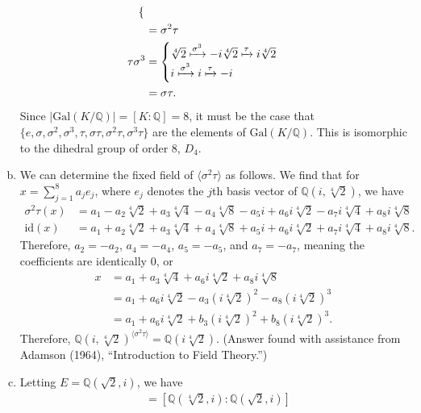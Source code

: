\documentclass[10pt]{extarticle}
\newcommand{\Q}{\mathbb{Q}}
\begin{document}
\begin{enumerate}[(a)]
\begin{align*}
\begin{cases}
              \end{cases}\\
                           &= \sigma^2\tau\\
                \tau\sigma^3 &= \begin{cases}
                  \sqrt[4]{2} \xmapsto{\sigma^3}-i\sqrt[4]{2}\xmapsto{\tau}i\sqrt[4]{2}\\
                  i \xmapsto{\sigma^3}i\xmapsto{\tau}-i
                \end{cases}\\
                             &= \sigma\tau.
      \end{align*}
      Since $|\text{Gal}(K/\Q)| = [K:\Q] = 8$, it must be the case that $\{e,\sigma,\sigma^2,\sigma^3,\tau,\sigma\tau,\sigma^2\tau,\sigma^3\tau\}$ are the elements of $\text{Gal}(K/\Q)$. This is isomorphic to the dihedral group of order 8, $D_4$.
    \item We can determine the fixed field of $\langle \sigma^2\tau\rangle$ as follows. We find that for $x = \sum_{j=1}^{8}a_je_j$, where $e_j$ denotes the $j$th basis vector of $\Q(i,\sqrt[4]{2})$, we have
      \begin{align*}
        \sigma^2\tau(x) &= a_1 - a_2\sqrt[4]{2} + a_3\sqrt[4]{4} - a_4\sqrt[4]{8} - a_5i + a_6i\sqrt[4]{2} - a_7i\sqrt[4]{4} + a_8i\sqrt[4]{8}\\
        \text{id}(x) &= a_1 + a_2\sqrt[4]{2} + a_3\sqrt[4]{4} + a_4\sqrt[4]{8} + a_5i + a_6i\sqrt[4]{2} + a_7i\sqrt[4]{4} + a_8i\sqrt[4]{8}.
      \end{align*}
      Therefore, $a_2 = -a_2$, $a_4 = -a_4$, $a_5 = -a_5$, and $a_7 = -a_7$, meaning the coefficients are identically $0$, or
      \begin{align*}
        x &= a_1 + a_3\sqrt[4]{4} + a_6i\sqrt[4]{2} + a_8i\sqrt[4]{8}\\
          &= a_1 + a_6i\sqrt[4]{2} - a_3\left(i\sqrt[4]{2}\right)^2 - a_8\left(i\sqrt[4]{2}\right)^3\\
          &= a_1 + a_6i\sqrt[4]{2} + b_3\left(i\sqrt[4]{2}\right)^2 + b_8\left(i\sqrt[4]{2}\right)^3.
      \end{align*}
      Therefore, $\Q\left(i,\sqrt[4]{2}\right)^{\langle \sigma^2\tau \rangle} = \Q(i\sqrt[4]{2})$. (Answer found with assistance from Adamson (1964), ``Introduction to Field Theory.'')
    \item Letting $E = \Q(\sqrt{2},i)$, we have
      \begin{align*}
        [K:E] &= [\Q(\sqrt[4]{2},i):\Q(\sqrt{2},i)]\\

\end{align*}
\end{enumerate}
\end{document}
